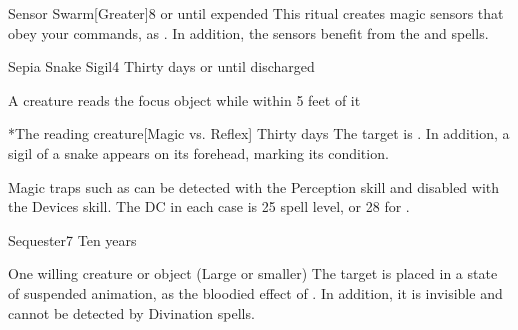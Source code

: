 \begin{spellsection}{Sensor Swarm}[Greater]{8}
\spelldur \durext or until expended \dismissable
{}
\spellline
\spelleffect This ritual creates magic sensors that obey your commands, as . In addition, the sensors benefit from the  and  spells.
\end{spellsection}

\begin{spellsection}{Sepia Snake Sigil}{4}
\spelldur Thirty days or until discharged
\spellline
\begin{spelltrigger}{A creature reads the focus object while within 5 feet of it}
    \begin{spelltarget}*{The reading creature}[Magic vs. Reflex]
        \spelldur Thirty days
        \spellsuccess The target is \slowed. In addition, a sigil of a snake appears on its forehead, marking its condition.
    \end{spelltarget}
\end{spelltrigger}
\spellnotes Magic traps such as  can be detected with the Perception skill and disabled with the Devices skill. The DC in each case is 25 \add spell level, or 28 for .
\end{spellsection}

\begin{spellsection}{Sequester}{7}
\spelldur Ten years
\begin{spelltarget}{One willing creature or object (Large or smaller)}
    \spelleffect The target is placed in a state of suspended animation, as the bloodied effect of . In addition, it is invisible and cannot be detected by Divination spells.
\end{spelltarget}
\end{spellsection}


